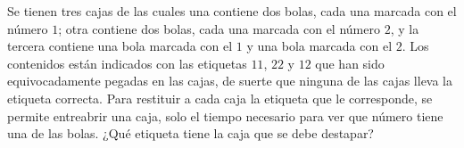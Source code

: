 Se tienen tres cajas de las cuales una contiene dos bolas, cada una marcada con el número $1$; otra contiene dos bolas, cada una marcada con el número $2$, y la tercera contiene una bola marcada con el $1$ y una bola marcada con el $2$. Los contenidos están indicados con las etiquetas $11$, $22$ y $12$ que han sido equivocadamente pegadas en las cajas, de suerte que ninguna de las cajas lleva la etiqueta correcta. Para restituir a cada caja la etiqueta que le corresponde, se permite entreabrir una caja, solo el tiempo necesario para ver que número tiene una de las bolas. ¿Qué etiqueta tiene la caja que se debe destapar?